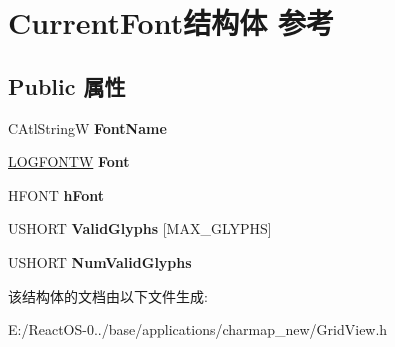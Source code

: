 \hypertarget{struct_current_font}{}\section{Current\+Font结构体 参考}
\label{struct_current_font}
\subsection*{Public 属性}
\begin{DoxyCompactItemize}
\item 
\mbox{\label{struct_current_font_aaf5b37f609cedaed600a6900f2394f80}} 
C\+Atl\+StringW {\bfseries Font\+Name}
\item 
\mbox{\label{struct_current_font_a961629c40c448a92331cd1ec3b3b6456}} 
\hyperlink{struct_l_o_g_f_o_n_t_w}{L\+O\+G\+F\+O\+N\+TW} {\bfseries Font}
\item 
\mbox{\label{struct_current_font_a5e9f7be4fad08179de53212c2d53c582}} 
H\+F\+O\+NT {\bfseries h\+Font}
\item 
\mbox{\label{struct_current_font_a788873a9e310d2175697f0a121c5103a}} 
U\+S\+H\+O\+RT {\bfseries Valid\+Glyphs} \mbox{[}M\+A\+X\+\_\+\+G\+L\+Y\+P\+HS\mbox{]}
\item 
\mbox{\label{struct_current_font_ae7db842cf322ce7d81b52f4cb2b58287}} 
U\+S\+H\+O\+RT {\bfseries Num\+Valid\+Glyphs}
\end{DoxyCompactItemize}


该结构体的文档由以下文件生成\+:\begin{DoxyCompactItemize}
\item 
E\+:/\+React\+O\+S-\/0../base/applications/charmap\+\_\+new/Grid\+View.\+h\end{DoxyCompactItemize}
